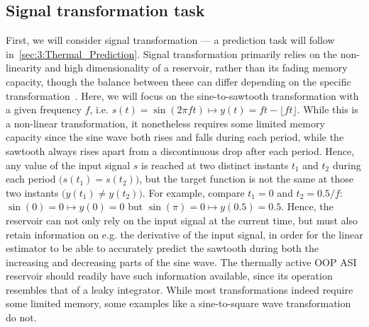 \subsection{Signal transformation task}
First, we will consider signal transformation --- a prediction task will follow in~\cref{sec:3:Thermal_Prediction}.
Signal transformation primarily relies on the non-linearity and high dimensionality of a reservoir, rather than its fading memory capacity, though the balance between these can differ depending on the specific transformation~\cite{FewMoleculeReservoir,gartside2022reconfigurable,TaskAdaptivePRC}.
Here, we will focus on the sine-to-sawtooth transformation with a given frequency $f$, i.e. $s(t) = \sin(2 \pi f t) \mapsto y(t) = ft - \lfloor ft \rfloor$.
While this is a non-linear transformation, it nonetheless requires some limited memory capacity since the sine wave both rises and falls during each period, while the sawtooth always rises apart from a discontinuous drop after each period.
Hence, any value of the input signal $s$ is reached at two distinct instants $t_1$ and $t_2$ during each period $\big(s(t_1) = s(t_2)\big)$, but the target function is not the same at those two instants $\big(y(t_1) \neq y(t_2)\big)$. %
For example, compare $t_1 = 0$ and $t_2 = 0.5/f$: $\sin(0) = 0 \mapsto y(0) = 0$ but $\sin(\pi) = 0 \mapsto y(0.5) = 0.5$.
Hence, the reservoir can not only rely on the input signal at the current time, but must also retain information on e.g. the derivative of the input signal, in order for the linear estimator to be able to accurately predict the sawtooth during both the increasing and decreasing parts of the sine wave.
The thermally active OOP ASI reservoir should readily have such information available, since its operation resembles that of a leaky integrator.
While most transformations indeed require some limited memory, some examples like a sine-to-square wave transformation do not.

